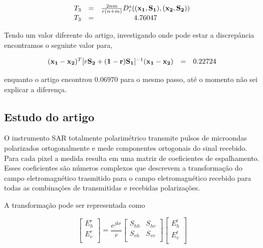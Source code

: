 \documentclass[12pt,a4paper]{article}
\begin{document}
\begin{description}
\begin{equation}\label{sec3eqn4}
\begin{array}{ccc}
	T_3&=&\frac{2nm}{r(n+m)}D_r^s(({\bf x_1}, {\bf S_1}),({\bf x_2}, {\bf S_2})) \\
	T_3&=&4.76047
\end{array}
\end{equation}

Tendo um valor diferente do artigo, investigando onde pode estar a discrepância encontramos o seguinte valor para, 

\begin{equation}\label{sec3eqn5}
\begin{array}{ccc}
	({\bf x_1}-{\bf x_2})^T [r{\bf S_2+(1-r){\bf S_1}}]^{-1}({\bf x_1}-{\bf x_2})&=& 0.22724\\
\end{array}
\end{equation}

enquanto o artigo encontrou $0.06970$ para o mesmo passo, até o momento não sei explicar a diferença.

\end{description}


\subsection{Estudo do artigo  \cite{anfinsen2009}}

O instrumento SAR totalmente polarimétrico transmite pulsos de microondas polarizados ortogonalmente e mede componentes ortogonais do sinal recebido. Para cada pixel a medida resulta em uma matriz de coeficientes de espalhamento. Esses coeficientes são números complexos que descrevem a transformação do campo eletromagnético trasmitido para o campo eletromagnético recebido para todas as combinações de transmitidas e recebidas polarizações.

A transformação pode ser representada como

\begin{equation}\label{sec4eqn1}
 \left[
\begin{array}{c}
	E_{h}^{r}   \\
	E_{v}^{r}    \\
\end{array}
\right]
 = \frac{e^{jkr}}{r}\left[
\begin{array}{cc}
	S_{hh}   & S_{hv}   \\
	S_{vh}   & S_{vv}   \\
\end{array}
\right]
 \left[
\begin{array}{c}
	E_{h}^{t}   \\
	E_{v}^{t}    \\
\end{array}
\right]
\end{equation}
\end{document}
